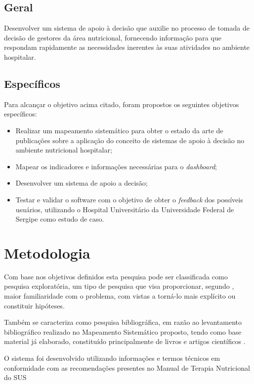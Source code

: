 \subsection{Geral}\label{sec-divisoes-subsection}
Desenvolver um sistema de apoio à decisão que auxilie no processo de tomada de decisão de gestores da área nutricional, fornecendo informação para que respondam rapidamente as necessidades inerentes às suas atividades no ambiente hospitalar.
\subsection{Específicos}\label{sec-divisoes-subsection}
Para alcançar o objetivo acima citado, foram propostos os seguintes objetivos específicos:
\begin{itemize}
 \item Realizar um mapeamento sistemático para obter o estado da arte de publicações sobre a aplicação do conceito de sistemas  de apoio à decisão no ambiente nutricional hospitalar;

 \item Mapear os indicadores e informações necessárias para o \textit{dashboard};

 \item Desenvolver um sistema de apoio a decisão;

 \item Testar e validar o software com o objetivo de obter o \textit{feedback} dos possíveis usuários, utilizando o Hospital Universitário da Universidade Federal de Sergipe como estudo de caso.
\end{itemize}

\section{Metodologia}\label{sec-divisoes}
Com base nos objetivos definidos esta pesquisa pode ser classificada como pesquisa exploratória, um tipo de pesquisa que visa proporcionar, segundo , maior familiaridade com o problema, com vistas a torná-lo mais explícito ou constituir hipóteses.

Também se caracteriza como pesquisa bibliográfica, em razão ao levantamento bibliográfico realizado no Mapeamento Sistemático proposto, tendo como base material já elaborado, constituído principalmente de livros e artigos científicos \cite{gil2002}.

O sistema foi desenvolvido utilizando informações e termos técnicos em conformidade com as recomendações presentes no Manual de Terapia Nutricional do SUS \cite{manualnutricao2016}

